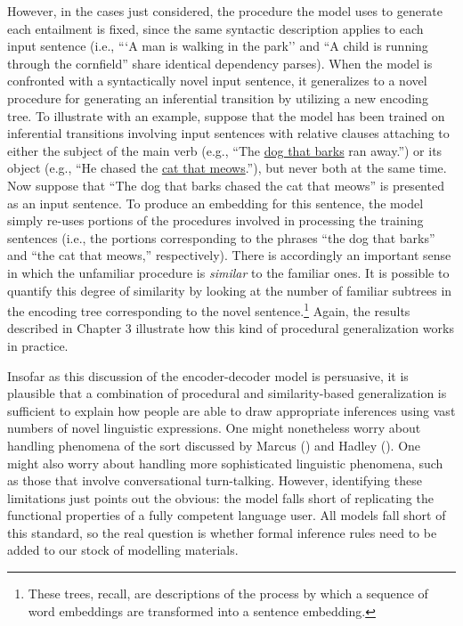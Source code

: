 However, in the cases just considered, the procedure the model uses to generate each entailment is fixed, since the same syntactic description applies to each input sentence (i.e., ```A man is walking in the park'' and ``A child is running through the cornfield'' share identical dependency parses). When the model is confronted with a syntactically novel input sentence, it generalizes to a novel procedure for generating an inferential transition by utilizing a new encoding tree. To illustrate with an example, suppose that the model has been trained on inferential transitions involving input sentences with relative clauses attaching to either the subject of the main verb (e.g., ``The \underline{dog that barks} ran away.'') or its object (e.g., ``He chased the \underline{cat that meows}.''), but never both at the same time. Now suppose that ``The dog that barks chased the cat that meows'' is presented as an input sentence. To produce an embedding for this sentence, the model simply re-uses portions of the procedures involved in processing the training sentences (i.e., the portions corresponding to the phrases ``the dog that barks'' and ``the cat that meows,'' respectively). There is accordingly an important sense in which the unfamiliar procedure is \textit{similar} to the familiar ones. It is possible to quantify this degree of similarity by looking at the number of familiar subtrees in the encoding tree corresponding to the novel sentence.\footnote{These trees, recall, are descriptions of the process by which a sequence of word embeddings are transformed into a sentence embedding.} Again, the results described in Chapter 3 illustrate how this kind of procedural generalization works in practice. 
 
Insofar as this discussion of the encoder-decoder model is persuasive, it is plausible that a combination of procedural and similarity-based generalization is sufficient to explain how people are able to draw appropriate inferences using vast numbers of novel linguistic expressions. One might nonetheless worry about handling phenomena of the sort discussed by Marcus (\citeyear{Marcus:1998}) and Hadley (\citeyear{Hadley:2009}). One might also worry about handling more sophisticated linguistic phenomena, such as those that involve conversational turn-talking. However, identifying these limitations just points out the obvious: the model falls short of replicating the functional properties of a fully competent language user. All models fall short of this standard, so the real question is whether formal inference rules need to be added to our stock of modelling materials.

